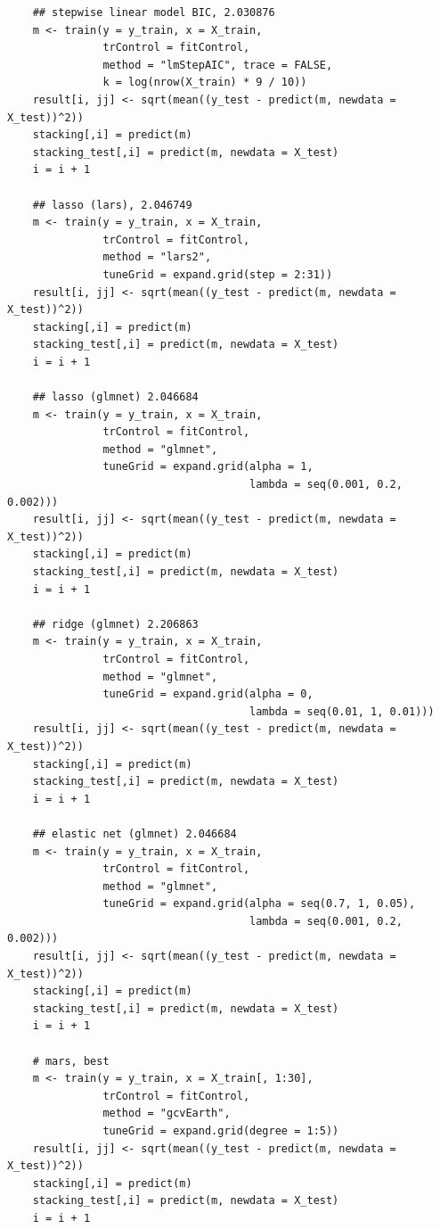 \documentclass[11pt,oneside,a4paper]{article}
\begin{document}
\begin{verbatim}
    ## stepwise linear model BIC, 2.030876
    m <- train(y = y_train, x = X_train,
               trControl = fitControl,
               method = "lmStepAIC", trace = FALSE, 
               k = log(nrow(X_train) * 9 / 10))
    result[i, jj] <- sqrt(mean((y_test - predict(m, newdata = X_test))^2))
    stacking[,i] = predict(m)
    stacking_test[,i] = predict(m, newdata = X_test)
    i = i + 1
    
    ## lasso (lars), 2.046749
    m <- train(y = y_train, x = X_train,
               trControl = fitControl,
               method = "lars2", 
               tuneGrid = expand.grid(step = 2:31))
    result[i, jj] <- sqrt(mean((y_test - predict(m, newdata = X_test))^2))
    stacking[,i] = predict(m)
    stacking_test[,i] = predict(m, newdata = X_test)
    i = i + 1
    
    ## lasso (glmnet) 2.046684
    m <- train(y = y_train, x = X_train,
               trControl = fitControl,
               method = "glmnet", 
               tuneGrid = expand.grid(alpha = 1, 
                                      lambda = seq(0.001, 0.2, 0.002)))
    result[i, jj] <- sqrt(mean((y_test - predict(m, newdata = X_test))^2))
    stacking[,i] = predict(m)
    stacking_test[,i] = predict(m, newdata = X_test)
    i = i + 1
    
    ## ridge (glmnet) 2.206863
    m <- train(y = y_train, x = X_train,
               trControl = fitControl,
               method = "glmnet", 
               tuneGrid = expand.grid(alpha = 0, 
                                      lambda = seq(0.01, 1, 0.01)))
    result[i, jj] <- sqrt(mean((y_test - predict(m, newdata = X_test))^2))
    stacking[,i] = predict(m)
    stacking_test[,i] = predict(m, newdata = X_test)
    i = i + 1
    
    ## elastic net (glmnet) 2.046684
    m <- train(y = y_train, x = X_train,
               trControl = fitControl,
               method = "glmnet", 
               tuneGrid = expand.grid(alpha = seq(0.7, 1, 0.05), 
                                      lambda = seq(0.001, 0.2, 0.002)))
    result[i, jj] <- sqrt(mean((y_test - predict(m, newdata = X_test))^2))
    stacking[,i] = predict(m)
    stacking_test[,i] = predict(m, newdata = X_test)
    i = i + 1
    
    # mars, best
    m <- train(y = y_train, x = X_train[, 1:30],
               trControl = fitControl,
               method = "gcvEarth", 
               tuneGrid = expand.grid(degree = 1:5))
    result[i, jj] <- sqrt(mean((y_test - predict(m, newdata = X_test))^2))
    stacking[,i] = predict(m)
    stacking_test[,i] = predict(m, newdata = X_test)
    i = i + 1
    

\end{verbatim}
\end{document}
